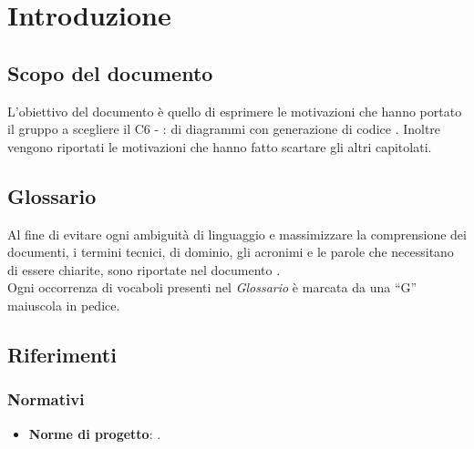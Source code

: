 \documentclass[../StudiodiFattibilita.tex]{subfiles}
\begin{document}
	\section{Introduzione}
		\subsection{Scopo del documento}
			L'obiettivo del documento è quello di esprimere le motivazioni che hanno portato il gruppo a scegliere il  C6 - \progetto:  di diagrammi  con generazione di codice .
			Inoltre vengono riportati le motivazioni che hanno fatto scartare gli altri capitolati.
		\subsection{Glossario}
			Al fine di evitare ogni ambiguità di linguaggio e massimizzare la
			comprensione dei documenti, i termini tecnici, di dominio, gli
			acronimi e le parole che necessitano di essere chiarite, sono
			riportate nel documento \glossariov.\\
			Ogni occorrenza di vocaboli presenti nel \textit{Glossario} è
			marcata da una ``G'' maiuscola in pedice.
		\subsection{Riferimenti}
			\subsubsection{Normativi}
			\begin{itemize}
				\item \textbf{Norme di progetto}: \normediprogettov.
			\end{itemize}
\end{document}
